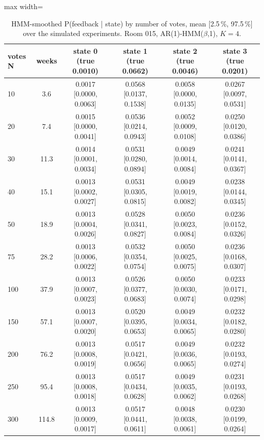 \begin{table}[ht]
\centering
\begin{adjustbox}{max width=\textwidth}
\begin{tabular}{lccccc}
\hline
votes N & weeks & state 0 (true 0.0010) & state 1 (true 0.0662) & state 2 (true 0.0046) & state 3 (true 0.0201) \\
\hline
10 & 3.6 & 0.0017 [0.0000, 0.0063] & 0.0568 [0.0137, 0.1538] & 0.0058 [0.0000, 0.0135] & 0.0267 [0.0097, 0.0531] \\
20 & 7.4 & 0.0015 [0.0000, 0.0041] & 0.0536 [0.0214, 0.0943] & 0.0052 [0.0009, 0.0108] & 0.0250 [0.0120, 0.0386] \\
30 & 11.3 & 0.0014 [0.0001, 0.0034] & 0.0531 [0.0280, 0.0894] & 0.0049 [0.0014, 0.0084] & 0.0241 [0.0141, 0.0367] \\
40 & 15.1 & 0.0013 [0.0002, 0.0027] & 0.0531 [0.0305, 0.0815] & 0.0049 [0.0019, 0.0082] & 0.0238 [0.0144, 0.0345] \\
50 & 18.9 & 0.0013 [0.0004, 0.0026] & 0.0528 [0.0341, 0.0827] & 0.0050 [0.0023, 0.0084] & 0.0236 [0.0152, 0.0326] \\
75 & 28.2 & 0.0013 [0.0006, 0.0022] & 0.0532 [0.0354, 0.0754] & 0.0050 [0.0025, 0.0075] & 0.0236 [0.0168, 0.0307] \\
100 & 37.9 & 0.0013 [0.0007, 0.0023] & 0.0526 [0.0377, 0.0683] & 0.0050 [0.0030, 0.0074] & 0.0233 [0.0171, 0.0298] \\
150 & 57.1 & 0.0013 [0.0007, 0.0020] & 0.0520 [0.0395, 0.0653] & 0.0049 [0.0034, 0.0065] & 0.0232 [0.0182, 0.0280] \\
200 & 76.2 & 0.0013 [0.0008, 0.0019] & 0.0517 [0.0421, 0.0656] & 0.0049 [0.0036, 0.0065] & 0.0232 [0.0193, 0.0274] \\
250 & 95.4 & 0.0013 [0.0008, 0.0018] & 0.0517 [0.0434, 0.0628] & 0.0049 [0.0035, 0.0062] & 0.0231 [0.0193, 0.0268] \\
300 & 114.8 & 0.0013 [0.0009, 0.0017] & 0.0517 [0.0441, 0.0611] & 0.0048 [0.0038, 0.0061] & 0.0230 [0.0199, 0.0264] \\
\hline
\end{tabular}
\end{adjustbox}
\caption{HMM-smoothed P(feedback | state) by number of votes, mean [2.5\,\%, 97.5\,\%] over the simulated experiments. Room 015, AR(1)-HMM($\beta$,1), $K=4$.}
\label{tab:feedback_p_room_015_ar1_hmm_beta_1_K4}
\end{table}
